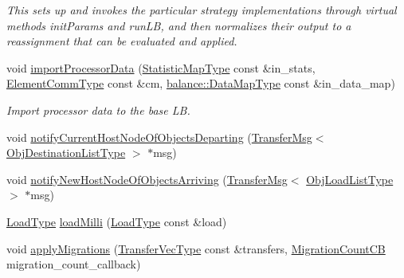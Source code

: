 \begin{DoxyCompactItemize}
\begin{DoxyCompactList}\small\item\em This sets up and invokes the particular strategy implementations through virtual methods {\ttfamily init\+Params} and {\ttfamily run\+LB}, and then normalizes their output to a reassignment that can be evaluated and applied. \end{DoxyCompactList}\item 
void \hyperlink{structvt_1_1vrt_1_1collection_1_1lb_1_1_base_l_b_acdf39bf5a6d72d1f9e36c9a0508992fc}{import\+Processor\+Data} (\hyperlink{structvt_1_1vrt_1_1collection_1_1lb_1_1_base_l_b_acd9bdad961ac83c96b7a227de672f96c}{Statistic\+Map\+Type} const \&in\+\_\+stats, \hyperlink{structvt_1_1vrt_1_1collection_1_1lb_1_1_base_l_b_a83eb4daec14edfb8780422e95b8e38d3}{Element\+Comm\+Type} const \&cm, \hyperlink{namespacevt_1_1vrt_1_1collection_1_1balance_a5794b6bc763c88c78228074bd0d1a50f}{balance\+::\+Data\+Map\+Type} const \&in\+\_\+data\+\_\+map)
\begin{DoxyCompactList}\small\item\em Import processor data to the base LB. \end{DoxyCompactList}\item 
void \hyperlink{structvt_1_1vrt_1_1collection_1_1lb_1_1_base_l_b_a0f3cd0272069ff5fb31d6539c567efeb}{notify\+Current\+Host\+Node\+Of\+Objects\+Departing} (\hyperlink{structvt_1_1vrt_1_1collection_1_1lb_1_1_transfer_msg}{Transfer\+Msg}$<$ \hyperlink{structvt_1_1vrt_1_1collection_1_1lb_1_1_base_l_b_ad50ba1022c6beeb6e9187a8f1a3e16fe}{Obj\+Destination\+List\+Type} $>$ $\ast$msg)
\item 
void \hyperlink{structvt_1_1vrt_1_1collection_1_1lb_1_1_base_l_b_a2bab9ccb4d2378b3915b03c79d5b18c2}{notify\+New\+Host\+Node\+Of\+Objects\+Arriving} (\hyperlink{structvt_1_1vrt_1_1collection_1_1lb_1_1_transfer_msg}{Transfer\+Msg}$<$ \hyperlink{structvt_1_1vrt_1_1collection_1_1lb_1_1_base_l_b_ab19ea4bb93a63cd22645cc03a58651f1}{Obj\+Load\+List\+Type} $>$ $\ast$msg)
\item 
\hyperlink{namespacevt_a8fb51741340b87d7aaee0bef60e9896b}{Load\+Type} \hyperlink{structvt_1_1vrt_1_1collection_1_1lb_1_1_base_l_b_a82c6f98e4294a85e7599964c01fdb1b9}{load\+Milli} (\hyperlink{namespacevt_a8fb51741340b87d7aaee0bef60e9896b}{Load\+Type} const \&load)
\item 
void \hyperlink{structvt_1_1vrt_1_1collection_1_1lb_1_1_base_l_b_aa19210106d6f44ea03b446c7f6a92cb1}{apply\+Migrations} (\hyperlink{structvt_1_1vrt_1_1collection_1_1lb_1_1_base_l_b_a329e8179ec41a1bd4924c79fe23a79af}{Transfer\+Vec\+Type} const \&transfers, \hyperlink{structvt_1_1vrt_1_1collection_1_1lb_1_1_base_l_b_aba7198eb30aef1b19c1f1efdea760543}{Migration\+Count\+CB} migration\+\_\+count\+\_\+callback)

\end{DoxyCompactItemize}
